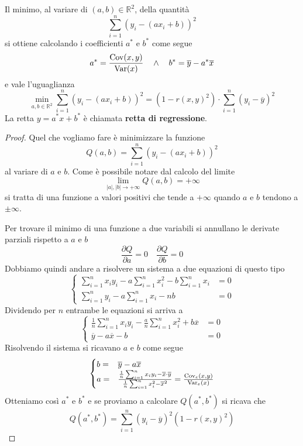 \begin{theorem}
	Il minimo, al variare di $(a, b) \in \mathbb{R}^2$, della quantità
	\[ \sum_{i=1}^n (y_i - (a x_i + b))^2 \]
	si ottiene calcolando i coefficienti $a^*$ e $b^*$ come segue
	\[ a^* = \frac{\operatorname{Cov}(x, y)}{\operatorname{Var}(x)} \quad \wedge \quad b^* = \overline{y} - a^* \overline{x} \]
	e vale l'uguaglianza
	\[
		\min_{a, b \in \mathbb{R}^2} \sum_{i=1}^n (y_i - (a x_i + b))^2 =
		(1 - r(x, y)^2) \cdot \sum_{i=1}^n (y_i - \overline{y})^2
	\]
	La retta $y = a^* x + b^*$ è chiamata \textbf{retta di regressione}.
	\begin{proof}
		Quel che vogliamo fare è minimizzare la funzione
		\[ Q(a, b) = \sum_{i=1}^n (y_i - (a x_i + b))^2 \]
		al variare di $a$ e $b$. Come è possibile notare dal calcolo del limite
		\[ \lim_{|a|, |b| \to +\infty} Q(a, b) = +\infty \]
		si tratta di una funzione a valori positivi che tende a $+\infty$ quando $a$ e $b$
		tendono a
		$\pm\infty$.

		Per trovare il minimo di una funzione a due variabili si annullano le derivate parziali
		rispetto a $a$ e $b$
		\[ \frac{\partial Q}{\partial a} = 0 \quad \frac{\partial Q}{\partial b} = 0 \]
		Dobbiamo quindi andare a risolvere un sistema a due equazioni di questo tipo
		\[
			\begin{cases}
				\sum_{i=1}^n x_i y_i - a \sum_{i=1}^n x_i^2 - b \sum_{i=1}^n x_i & = 0 \\
				\sum_{i=1}^n y_i - a \sum_{i=1}^n x_i - n b                      & = 0
			\end{cases}
		\]
		Dividendo per $n$ entrambe le equazioni si arriva a
		\[
			\begin{cases}
				\frac{1}{n} \sum_{i=1}^n x_i y_i - \frac{a}{n} \sum_{i=1}^n x_i^2 +
				b \overline{x}                    & = 0 \\
				\overline{y} - a \overline{x} - b & = 0
			\end{cases}
		\]
		Risolvendo il sistema si ricavano $a$ e $b$ come segue
		\[
			\begin{cases}
				b = & \overline{y} - a \overline{x}            \\
				a = & \frac{\frac{1}{n} \sum_{i=1}^n x_i y_i -
					\overline{x} \cdot \overline{y}}
				{\frac{1}{n} \sum_{i=1}^n x_i^2 - \overline{x}^2} =
				\frac{\operatorname{Cov}_e(x, y)}{\operatorname{Var}_e(x)}
			\end{cases}
		\]
		Otteniamo così $a^*$ e $b^*$ e se proviamo a calcolare $Q(a^*, b^*)$ si ricava che
		\[ Q(a^*, b^*) = \sum_{i=1}^n (y_i - \overline{y})^2 (1 - r(x, y)^2) \]
	\end{proof}
\end{theorem}

